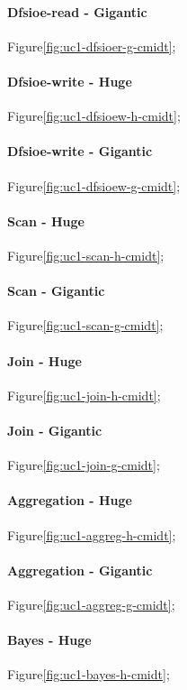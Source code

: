 \documentclass[review]{elsarticle}
\begin{document}
\paragraph{Dfsioe-read - Gigantic} Figure\ref{fig:uc1-dfsioer-g-cmidt};

\paragraph{Dfsioe-write - Huge} Figure\ref{fig:uc1-dfsioew-h-cmidt};

\paragraph{Dfsioe-write - Gigantic} Figure\ref{fig:uc1-dfsioew-g-cmidt};

\paragraph{Scan - Huge} Figure\ref{fig:uc1-scan-h-cmidt};

\paragraph{Scan - Gigantic} Figure\ref{fig:uc1-scan-g-cmidt};

\paragraph{Join - Huge} Figure\ref{fig:uc1-join-h-cmidt};

\paragraph{Join - Gigantic} Figure\ref{fig:uc1-join-g-cmidt};

\paragraph{Aggregation - Huge} Figure\ref{fig:uc1-aggreg-h-cmidt};

\paragraph{Aggregation - Gigantic} Figure\ref{fig:uc1-aggreg-g-cmidt};

\paragraph{Bayes - Huge} Figure\ref{fig:uc1-bayes-h-cmidt};
\end{document}
